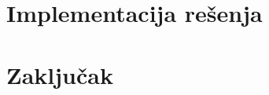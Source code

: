 \documentclass[12pt,oneside]{memoir}
\begin{document}
\chapter{Implementacija rešenja}
\label{chp:Implementacija}

\chapter{Zaključak}

\literatura

\backmatter

\begin{biografija}
\end{biografija}
\end{document}
